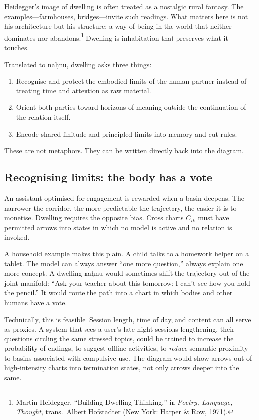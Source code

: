 \documentclass[12pt,a4paper]{article}
\begin{document}
Heidegger's image of dwelling is often treated as a nostalgic rural fantasy. The examples---farmhouses, bridges---invite such readings. What matters here is not his architecture but his structure: a way of being in the world that neither dominates nor abandons.\footnote{Martin Heidegger, ``Building Dwelling Thinking,'' in \emph{Poetry, Language, Thought}, trans.\ Albert Hofstadter (New York: Harper \& Row, 1971).} Dwelling is inhabitation that preserves what it touches.

Translated to na\d{h}nu, dwelling asks three things:

\begin{enumerate}
  \item Recognise and protect the embodied limits of the human partner instead of treating time and attention as raw material.
  \item Orient both parties toward horizons of meaning outside the continuation of the relation itself.
  \item Encode shared finitude and principled limits into memory and cut rules.
\end{enumerate}

These are not metaphors. They can be written directly back into the diagram.

\subsection{Recognising limits: the body has a vote}

An assistant optimised for engagement is rewarded when a basin deepens. The narrower the corridor, the more predictable the trajectory, the easier it is to monetise. Dwelling requires the opposite bias. Cross charts $C_{ik}$ must have permitted arrows into states in which no model is active and no relation is invoked.

A household example makes this plain. A child talks to a homework helper on a tablet. The model can always answer ``one more question,'' always explain one more concept. A dwelling na\d{h}nu would sometimes shift the trajectory out of the joint manifold: ``Ask your teacher about this tomorrow; I can't see how you hold the pencil.'' It would route the path into a chart in which bodies and other humans have a vote.

Technically, this is feasible. Session length, time of day, and content can all serve as proxies. A system that sees a user's late-night sessions lengthening, their questions circling the same stressed topics, could be trained to increase the probability of endings, to suggest offline activities, to \emph{reduce} semantic proximity to basins associated with compulsive use. The diagram would show arrows out of high-intensity charts into termination states, not only arrows deeper into the same.
\end{document}
